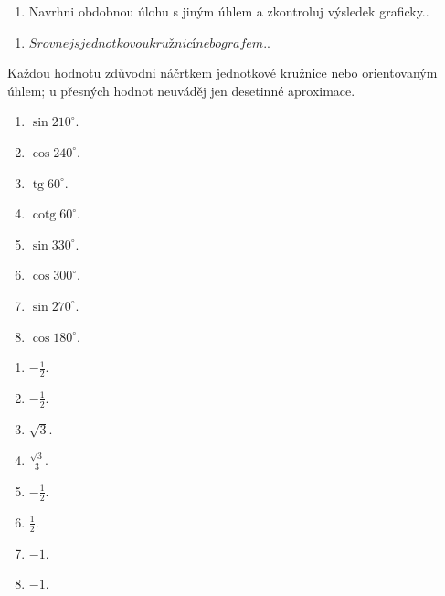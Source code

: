 \documentclass[11pt,a4paper]{article}
\begin{document}
\begin{zadaniReseniBox}[title={Rozšíření 1}]
\begin{enumerate}[label=\alph*)]
\item Navrhni obdobnou úlohu s jiným úhlem a zkontroluj výsledek graficky..
\end{enumerate}
\tcblower
\begin{enumerate}[label=\alph*)]
\item $Srovnej s jednotkovou kružnicí nebo grafem.$.
\end{enumerate}
\end{zadaniReseniBox}
Každou hodnotu zdůvodni náčrtkem jednotkové kružnice nebo orientovaným úhlem; u přesných hodnot neuváděj jen desetinné aproximace.
\begin{zadaniReseniBox}[title={Domácí úkol}]
\begin{enumerate}[label=\alph*)]
\item $\sin210^\circ$.
\item $\cos240^\circ$.
\item $\operatorname{tg}60^\circ$.
\item $\operatorname{cotg}60^\circ$.
\item $\sin330^\circ$.
\item $\cos300^\circ$.
\item $\sin270^\circ$.
\item $\cos180^\circ$.
\end{enumerate}
\tcblower
\begin{enumerate}[label=\alph*)]
\item $-\frac{1}{2}$.
\item $-\frac{1}{2}$.
\item $\sqrt3$.
\item $\frac{\sqrt3}{3}$.
\item $-\frac{1}{2}$.
\item $\frac{1}{2}$.
\item $-1$.
\item $-1$.
\end{enumerate}
\end{zadaniReseniBox}
\end{document}
